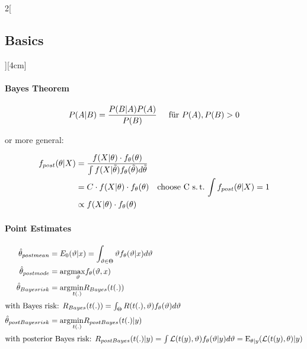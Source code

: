 \documentclass[8pt]{extarticle}
\begin{document}
\begin{multicols}{2}[\subsection{Basics}][4cm] 

\paragraph{Bayes Theorem}
$$P(A|B)=\frac{P(B|A)P(A)}{P(B)} \hspace{0.5cm} \text{für } P(A), P(B) > 0$$

or more general:

\vspace{-1 em}

\begin{align*}
  f_{post}(\theta | X) &= \frac{f(X | \theta ) \cdot f_\theta(\theta)}{\int f(X|\tilde{\theta}) f_\theta(\tilde{\theta})  d \tilde{\theta}}\\
  &= C \cdot f(X | \theta ) \cdot f_\theta(\theta) \hspace{1 em} \text{choose C s.\,t.\  $\int f_{post}(\theta | X)=1$} \\
  &\propto f(X | \theta ) \cdot f_\theta(\theta)
\end{align*}

\paragraph{Point Estimates}

\begin{align*}
\hat{\theta}_{postmean} &= E_0(\vartheta|x) = \int_{\vartheta \in \Theta} \vartheta f_\theta(\vartheta|x)d\vartheta\\
\hat{\theta}_{postmode} &= \mathrm{arg} \underset{\vartheta}{\max} f_\theta(\vartheta,x)\\
\hat{\theta}_{Bayesrisk} &= \mathrm{arg} \underset{t(.)}{\min} R_{Bayes}(t(.))\\
\intertext{with Bayes risk: $ R_{Bayes}(t(.)) = \int_{\Theta} R(t(.),\vartheta)f_\theta(\vartheta)d\vartheta$}
\hat{\theta}_{postBayesrisk} &= \mathrm{arg} \underset{t(.)}{\min} R_{postBayes}(t(.)|y)\\
\intertext{with posterior Bayes risk: $ R_{postBayes}(t(.)|y) = \int \mathcal{L}(t(y),\vartheta) f_\theta(\vartheta|y) d\vartheta = \mathrm{E}_{\theta|y}(\mathcal{L}(t(y),\theta)|y)$}
\end{align*}

\vspace{-1.5em}


\end{multicols}
\end{document}
